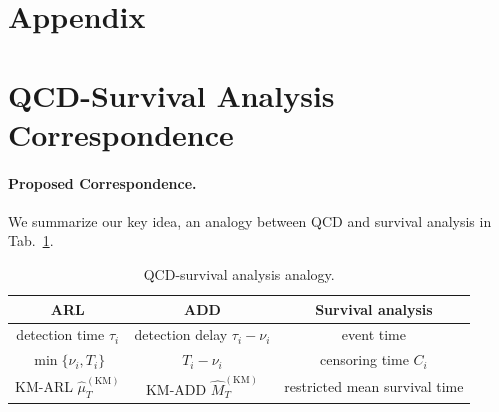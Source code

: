 \documentclass{article}
\theoremstyle{plain}
\theoremstyle{definition}
\theoremstyle{remark}
\begin{document}












\clearpage
\appendix
\onecolumn

\section*{Appendix}

\section{QCD-Survival Analysis Correspondence} \label{app:Correspondence}
\paragraph{Proposed Correspondence.}
We summarize our key idea, an analogy between QCD and survival analysis in Tab.~\ref{tab:correspondence}.
\begin{table}[htbp]
    \centering
    \begin{tabular}{ccc}
        ARL                                & ADD                              & Survival analysis            \\
        \hline 
        detection time $\tau_i$            & detection delay $\tau_i - \nu_i$ & event time                   \\
        $\min \{ \nu_i, T_i \}$            & $T_i - \nu_i$                    & censoring time $C_i$         \\
        KM-ARL $\hat{\mu}^\mathrm{(KM)}_T$ & KM-ADD $\hat{M}^\mathrm{(KM)}_T$ & restricted mean survival time\\
    \end{tabular}
    \caption{QCD-survival analysis analogy.}
    \label{tab:correspondence}
\end{table}
\end{document}
